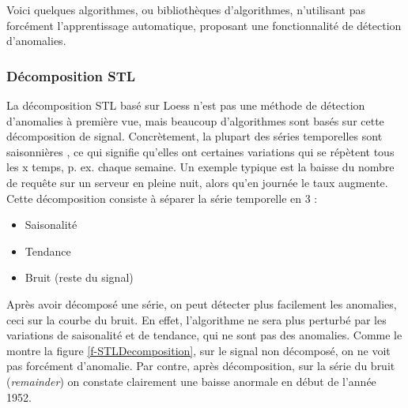 \documentclass[paper=a4, fontsize=11pt]{scrartcl}
\begin{document}
Voici quelques algorithmes, ou bibliothèques d'algorithmes, n'utilisant pas forcément l'apprentissage automatique, proposant une fonctionnalité de détection d'anomalies.

\subsubsection{Décomposition STL}
La décomposition STL basé sur Loess \cite{noauthor_regression_2018} n'est pas une méthode de détection d'anomalies à première vue, mais beaucoup d'algorithmes sont basés sur cette décomposition de signal. Concrètement, la plupart des séries temporelles sont saisonnières \cite{noauthor_seasonality_2020}, ce qui signifie qu'elles ont certaines variations qui se répètent tous les x temps, p. ex. chaque semaine. Un exemple typique est la baisse du nombre de requête sur un serveur en pleine nuit, alors qu'en journée le taux augmente. Cette décomposition consiste à séparer la série temporelle en 3 :
\begin{itemize}
    \item Saisonalité
    \item Tendance
    \item Bruit (reste du signal)
\end{itemize}
Après avoir décomposé une série, on peut détecter plus facilement les anomalies, ceci sur la courbe du bruit. En effet, l'algorithme ne sera plus perturbé par les variations de saisonalité et de tendance, qui ne sont pas des anomalies. Comme le montre la figure \ref{f-STLDecomposition}, sur le signal non décomposé, on ne voit pas forcément d'anomalie. Par contre, après décomposition, sur la série du bruit (\textit{remainder}) on constate clairement une baisse anormale en début de l'année 1952. 
\end{document}
